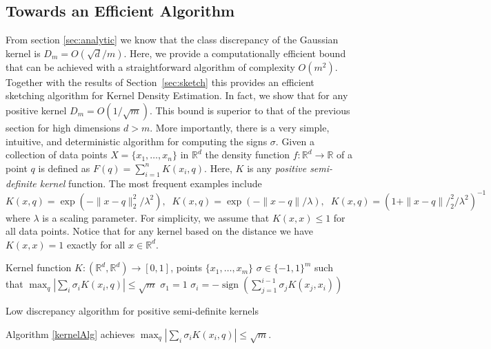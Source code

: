 \documentclass[12pt]{colt2019} %
\newcommand{\R}{\mathbb{R}}
\begin{document}
{\subsection{Towards an Efficient Algorithm}\label{kde2}

From section \ref{sec:analytic} we know that the class discrepancy of the Gaussian kernel is $D_m = O(\sqrt{d}/m)$. 
Here, we provide a computationally efficient bound that can be achieved with a straightforward algorithm of complexity $O(m^2)$. Together with the results of Section~\ref{sec:sketch} this provides an efficient sketching algorithm for Kernel Density Estimation. 
In fact, we show that for any positive kernel $D_m = O(1/\sqrt{m})$. This bound is superior to that of the previous section for high dimensions $d > m$. 
More importantly, there is a very simple, intuitive, and deterministic algorithm for computing the signs $\sigma$. 
Given a collection of data points $X = \{x_1,\ldots, x_n\}$ in $\R^d$ the density function $f: \R^d \rightarrow \R$ of a point $q$ is defined as $ F(q) = \sum_{i=1}^{n} K(x_i,q) $.
Here, $K$ is any \emph{positive semi-definite kernel} function. The most frequent examples include
$$ K(x,q) = \exp(- \|x-q\|_2^2/\lambda^2),\;\; K(x,q) = \exp(- \|x-q\|/\lambda) ,\;\;  K(x,q) = (1+\|x-q\|/_2^2/\lambda^2)^{-1}$$
where $\lambda$ is a scaling parameter. For simplicity, we assume that $K(x,x) \leq 1$ for all data points. Notice that for any kernel based on the distance we have $K(x,x)=1$ exactly for all $x \in \R^d$.

\begin{algorithm}
\begin{algorithmic}
 Kernel function $K:(\R^d,\R^d)\rightarrow[0,1]$, points  $\{x_1,\ldots,x_m\}$
 $\sigma \in \{-1,1\}^m$ such that $\max_q |\sum_i \sigma_i K(x_i,q) | \le \sqrt{m}$
\STATE$\sigma_1 = 1$
        \STATE $\sigma_i = -\operatorname{sign} (\sum_{j=1}^{i-1}\sigma_j  K(x_j, x_i))$
\ENDFOR 
\end{algorithmic}
\caption{Low discrepancy algorithm for positive semi-definite kernels}\label{kernelAlg}
\end{algorithm}


\begin{theorem} \label{thm:disc simple kernel}
Algorithm \ref{kernelAlg} achieves $\max_q |\sum_i \sigma_i K(x_i,q) | \le \sqrt{m}$.
\end{theorem}

}
\end{document}
